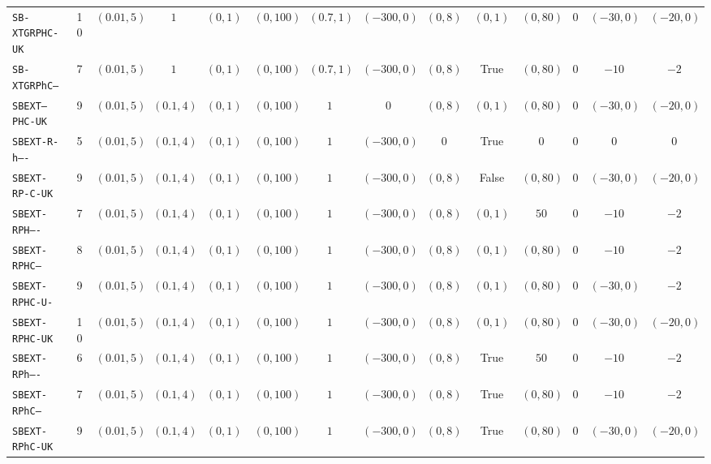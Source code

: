 {\begin{tabular}{l c c c c c c c c c c c c c }
\texttt{SB-XTGRPHC-UK} & 10 & $(0.01, 5)$ & $1$ & $(0, 1)$ & $(0, 100)$ & $(0.7, 1)$ & $(-300, 0)$ & $(0, 8)$ & $(0, 1)$ & $(0, 80)$ & $0$ & $(-30, 0)$ & $(-20, 0)$ \\
\texttt{SB-XTGRPhC---} & 7 & $(0.01, 5)$ & $1$ & $(0, 1)$ & $(0, 100)$ & $(0.7, 1)$ & $(-300, 0)$ & $(0, 8)$ & \textrm{True} & $(0, 80)$ & $0$ & $-10$ & $-2$ \\
\texttt{SBEXT--PHC-UK} & 9 & $(0.01, 5)$ & $(0.1, 4)$ & $(0, 1)$ & $(0, 100)$ & $1$ & $0$ & $(0, 8)$ & $(0, 1)$ & $(0, 80)$ & $0$ & $(-30, 0)$ & $(-20, 0)$ \\
\texttt{SBEXT-R-h----} & 5 & $(0.01, 5)$ & $(0.1, 4)$ & $(0, 1)$ & $(0, 100)$ & $1$ & $(-300, 0)$ & $0$ & \textrm{True} & $0$ & $0$ & $0$ & $0$ \\
\texttt{SBEXT-RP-C-UK} & 9 & $(0.01, 5)$ & $(0.1, 4)$ & $(0, 1)$ & $(0, 100)$ & $1$ & $(-300, 0)$ & $(0, 8)$ & \textrm{False} & $(0, 80)$ & $0$ & $(-30, 0)$ & $(-20, 0)$ \\
\texttt{SBEXT-RPH----} & 7 & $(0.01, 5)$ & $(0.1, 4)$ & $(0, 1)$ & $(0, 100)$ & $1$ & $(-300, 0)$ & $(0, 8)$ & $(0, 1)$ & $50$ & $0$ & $-10$ & $-2$ \\
\texttt{SBEXT-RPHC---} & 8 & $(0.01, 5)$ & $(0.1, 4)$ & $(0, 1)$ & $(0, 100)$ & $1$ & $(-300, 0)$ & $(0, 8)$ & $(0, 1)$ & $(0, 80)$ & $0$ & $-10$ & $-2$ \\
\texttt{SBEXT-RPHC-U-} & 9 & $(0.01, 5)$ & $(0.1, 4)$ & $(0, 1)$ & $(0, 100)$ & $1$ & $(-300, 0)$ & $(0, 8)$ & $(0, 1)$ & $(0, 80)$ & $0$ & $(-30, 0)$ & $-2$ \\
\texttt{SBEXT-RPHC-UK} & 10 & $(0.01, 5)$ & $(0.1, 4)$ & $(0, 1)$ & $(0, 100)$ & $1$ & $(-300, 0)$ & $(0, 8)$ & $(0, 1)$ & $(0, 80)$ & $0$ & $(-30, 0)$ & $(-20, 0)$ \\
\texttt{SBEXT-RPh----} & 6 & $(0.01, 5)$ & $(0.1, 4)$ & $(0, 1)$ & $(0, 100)$ & $1$ & $(-300, 0)$ & $(0, 8)$ & \textrm{True} & $50$ & $0$ & $-10$ & $-2$ \\
\texttt{SBEXT-RPhC---} & 7 & $(0.01, 5)$ & $(0.1, 4)$ & $(0, 1)$ & $(0, 100)$ & $1$ & $(-300, 0)$ & $(0, 8)$ & \textrm{True} & $(0, 80)$ & $0$ & $-10$ & $-2$ \\
\texttt{SBEXT-RPhC-UK} & 9 & $(0.01, 5)$ & $(0.1, 4)$ & $(0, 1)$ & $(0, 100)$ & $1$ & $(-300, 0)$ & $(0, 8)$ & \textrm{True} & $(0, 80)$ & $0$ & $(-30, 0)$ & $(-20, 0)$ \\
\bottomrule
\end{tabular}}
